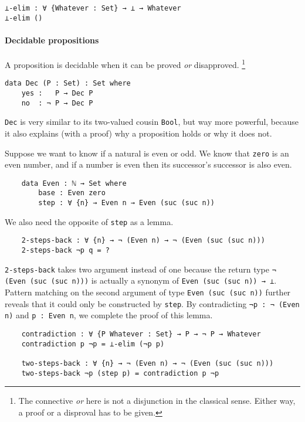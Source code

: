 \documentclass[../thesis.tex]{subfiles}
\begin{document}
\begin{lstlisting}
⊥-elim : ∀ {Whatever : Set} → ⊥ → Whatever
⊥-elim ()
\end{lstlisting}


\paragraph{Decidable propositions}

A proposition is decidable when it can be proved \textit{or} disapproved.
\footnote{The connective \textit{or} here is not a disjunction in the classical sense.
Either way, a proof or a disproval has to be given.}

\begin{lstlisting}
data Dec (P : Set) : Set where
    yes :   P → Dec P
    no  : ¬ P → Dec P
\end{lstlisting}

{\lstinline|Dec|} is very similar to its two-valued cousin {\lstinline|Bool|},
but way more powerful, because it also explains (with a proof) why a proposition
holds or why it does not.

Suppose we want to know if a natural is even or odd. We know that {\lstinline|zero|}
is an even number, and if a number is even then its successor's successor is also even.

\begin{lstlisting}
    data Even : ℕ → Set where
        base : Even zero
        step : ∀ {n} → Even n → Even (suc (suc n))
\end{lstlisting}

We also need the opposite of {\lstinline|step|} as a lemma.

\begin{lstlisting}
    2-steps-back : ∀ {n} → ¬ (Even n) → ¬ (Even (suc (suc n)))
    2-steps-back ¬p q = ?
\end{lstlisting}

{\lstinline|2-steps-back|} takes two argument instead of one because the return
type {\lstinline|¬ (Even (suc (suc n)))|} is actually a synonym of
{\lstinline|Even (suc (suc n)) → ⊥|}. Pattern matching on the second argument
of type {\lstinline|Even (suc (suc n))|} further reveals that it could only be
constructed by {\lstinline|step|}.  By contradicting {\lstinline|¬p : ¬ (Even n)|}
and {\lstinline|p : Even n|}, we complete the proof of this lemma.

\begin{lstlisting}
    contradiction : ∀ {P Whatever : Set} → P → ¬ P → Whatever
    contradiction p ¬p = ⊥-elim (¬p p)

    two-steps-back : ∀ {n} → ¬ (Even n) → ¬ (Even (suc (suc n)))
    two-steps-back ¬p (step p) = contradiction p ¬p
\end{lstlisting}
\end{document}
